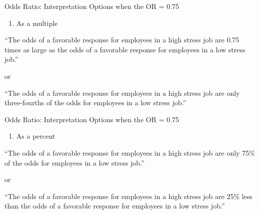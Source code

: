 \documentclass[12pt,ignorenonframetext,aspectratio=169]{beamer}
\def\tightlist{}
\begin{document}
\begin{frame}{Odds Ratio: Interpretation Options when the OR = 0.75}

\begin{enumerate}
\def\labelenumi{\arabic{enumi}.}
\tightlist
\item
  As a multiple
\end{enumerate}

``The odds of a favorable response for employees in a high stress job
are 0.75 times as large as the odds of a favorable response for
employees in a low stress job.''

or

``The odds of a favorable response for employees in a high stress job
are only three-fourths of the odds for employees in a low stress job.''


\end{frame}

\begin{frame}{Odds Ratio: Interpretation Options when the OR = 0.75}

\begin{enumerate}
\def\labelenumi{\arabic{enumi}.}
\setcounter{enumi}{1}
\tightlist
\item
  As a percent
\end{enumerate}

``The odds of a favorable response for employees in a high stress job
are only 75\% of the odds for employees in a low stress job.''

or

``The odds of a favorable response for employees in a high stress job
are 25\% less than the odds of a favorable response for employees in a
low stress job.''


\end{frame}
\end{document}
